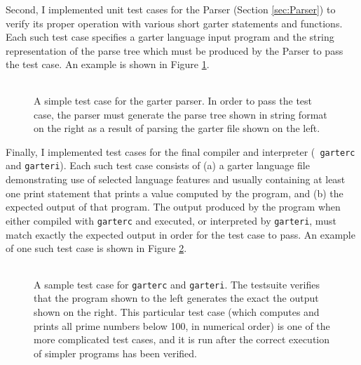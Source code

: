 \documentclass[11pt]{article}
\begin{document}
Second, I implemented unit test cases for the Parser (Section \ref{sec:Parser})
to verify its proper operation with various short garter statements and
functions.  Each such test case specifies a garter language input program and
the string representation of the parse tree which must be produced by the Parser
to pass the test case.  An example is shown in Figure \ref{fig:TestParser}.

\begin{figure}
    \begin{tabular}{|p{4cm}|p{11cm}|}
    \hline
    
    &
    
    \\ \hline
    \end{tabular}
    \caption{A simple test case for the garter parser.
        In order to pass the test case, the parser must generate the parse tree
        shown in string format on the right as a result of parsing the garter file
        shown on the left.  }
    \label{fig:TestParser}
\end{figure}

Finally, I implemented test cases for the final compiler and interpreter ({\tt
garterc} and {\tt garteri}).  Each such test case consists of (a) a garter
language file demonstrating use of selected language features and usually
containing at least one print statement that prints a value computed by the
program, and (b) the expected output of that program.  The output produced by
the program when either compiled with {\tt garterc} and executed, or interpreted
by {\tt garteri}, must match exactly the expected output in order for the test
case to pass.  An example of one such test case is shown in Figure
\ref{fig:garterc_test}.

\begin{figure}
    \begin{tabular}{|p{9cm}|p{4cm}|}
    \hline
    
    &
    
    \\ \hline
    \end{tabular}
    \caption{A sample test case for {\tt garterc} and {\tt garteri}.  The
        testsuite verifies that the program shown to the left generates the exact
        the output shown on the right.  This particular test case (which
        computes and prints all prime numbers below 100, in numerical order) is
        one of the more complicated test cases, and it is run after the correct
    execution of simpler programs has been verified.  }
    \label{fig:garterc_test}
\end{figure}
\end{document}

